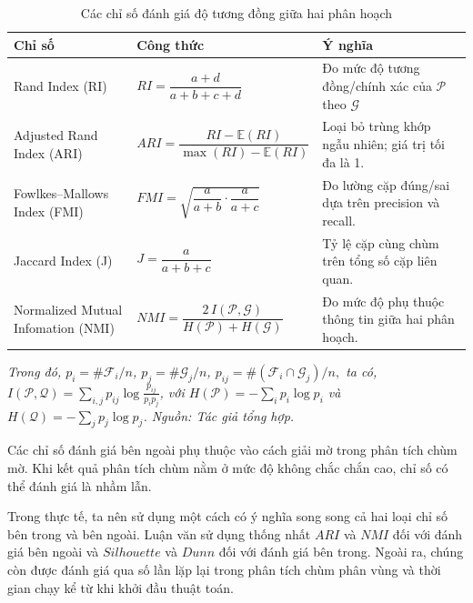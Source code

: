 \documentclass[a4paper,oneside]{book} %
\theoremstyle{plain}
\theoremstyle{plain}
\theoremstyle{nonumberplain}
\newcommand{\chy}[1]{\begin{remark}#1\end{remark}}
\begin{document}
\begin{table}[H]
	\centering
	\fontsize{11pt}{14pt}\selectfont
	\caption{Các chỉ số đánh giá độ tương đồng giữa hai phân hoạch}
	\begin{tabular*}{\textwidth}{@{\extracolsep\fill}p{4.5cm}lp{7cm}@{\extracolsep\fill}}
		\toprule
		\textbf{Chỉ số} & \textbf{Công thức} & \textbf{Ý nghĩa} \\
		\midrule
		Rand Index (RI) &
		$RI = \dfrac{a+d}{a+b+c+d}$ &
		 Đo mức độ tương đồng/chính xác của $\mathcal{P}$ theo $\mathcal{G}$\\[2mm]
		Adjusted Rand Index (ARI) &
		$ARI = \dfrac{RI - \mathbb{E}(RI)}{\max(RI) - \mathbb{E}(RI)}$ &
		Loại bỏ trùng khớp ngẫu nhiên; giá trị tối đa là 1.\\[2mm]
		Fowlkes–Mallows Index (FMI) &
		$FMI = \sqrt{\dfrac{a}{a+b}\cdot\dfrac{a}{a+c}}$ &
		Đo lường cặp đúng/sai dựa trên precision và recall.\\[2mm]
		Jaccard Index (J) &
		$J = \dfrac{a}{a+b+c}$ &
		Tỷ lệ cặp cùng chùm trên tổng số cặp liên quan.\\[2mm]
		Normalized Mutual Infomation (NMI) &
		$NMI = \dfrac{2\,I(\mathcal P,\mathcal G)}{H(\mathcal P)+H(\mathcal G)}$ &
		Đo mức độ phụ thuộc thông tin giữa hai phân hoạch.\\
		\bottomrule
	\end{tabular*}
\begin{minipage}{\textwidth}
		\fontsize{11pt}{14pt}\selectfont\it
		Trong đó, $ p_i = {\#\mathcal{F}_i}/{n}$, $p_j = {\#\mathcal{G}_j}/{n}$, $ p_{ij} = {\#(\mathcal{F}_i \cap \mathcal{G}_j)}/{n}, $ ta có, $I(\mathcal{P},\mathcal{Q}) = \sum_{i,j} p_{ij} \log \frac{p_{ij}}{p_i p_j}$, với $H(\mathcal{P}) = - \sum_i p_i \log p_i$ và $H(\mathcal{Q}) = - \sum_j p_j \log p_j$. Nguồn: Tác giả tổng hợp.
	\end{minipage}
\end{table}

\chy{
Các chỉ số đánh giá bên ngoài phụ thuộc vào cách giải mờ trong phân tích chùm mờ. Khi kết quả phân tích chùm nằm ở mức độ không chắc chắn cao, chỉ số có thể đánh giá là nhầm lẫn. 
}

Trong thực tế, ta nên sử dụng một cách có ý nghĩa song song cả hai loại chỉ số bên trong và bên ngoài. Luận văn sử dụng thống nhất $ARI$ và $NMI$ đối với đánh giá bên ngoài và $Silhouette$ và $Dunn$ đối với đánh giá bên trong. Ngoài ra, chúng còn được đánh giá qua số lần lặp lại trong phân tích chùm phân vùng và thời gian chạy kể từ khi khởi đầu thuật toán. 
\end{document}
